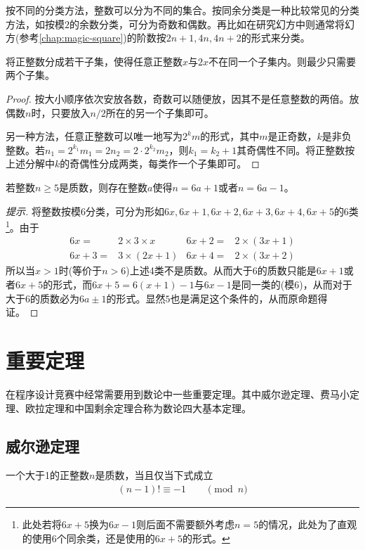 按不同的分类方法，整数可以分为不同的集合。按同余分类是一种比较常见的分类方法，如按模$2$的余数分类，可分为奇数和偶数。再比如在研究幻方中则通常将幻方(参考\ref{chap:magic-square})的阶数按$2n+1, 4n, 4n+2$的形式来分类。

\begin{example}
  将正整数分成若干子集，使得任意正整数$x$与$2x$不在同一个子集内。则最少只需要两个子集。
\end{example}
\begin{proof}
  按大小顺序依次安放各数，奇数可以随便放，因其不是任意整数的两倍。放偶数$n$时，只要放入$n/2$所在的另一个子集即可。

  另一种方法，任意正整数可以唯一地写为$2^km$的形式，其中$m$是正奇数，$k$是非负整数。若$n_1=2^{k_1}m_1 = 2n_2=2\cdot 2^{k_2}m_2$，则$k_1=k_2+1$其奇偶性不同。将正整数按上述分解中$k$的奇偶性分成两类，每类作一个子集即可。
\end{proof}

\begin{example}
  若整数$n\ge5$是质数，则存在整数$a$使得$n=6a+1$或者$n=6a-1$。
\end{example}
\begin{proof}[提示]
  将整数按模6分类，可分为形如$6x, 6x+1, 6x+2, 6x+3, 6x+4, 6x+5$的6类\footnote{此处若将$6x+5$换为$6x-1$则后面不需要额外考虑$n=5$的情况，此处为了直观的使用6个同余类，还是使用的$6x+5$的形式。}。由于
  \begin{align*}
    6x = & 2\times3\times x & 6x+2=&2\times(3x+1)\\
    6x+3=&3\times(2x+1) & 6x+4=&2\times(3x+2)
  \end{align*}
  所以当$x>1$时(等价于$n>6$)上述4类不是质数。从而大于6的质数只能是$6x+1$或者$6x+5$的形式，而$6x+5=6(x+1)-1$与$6x-1$是同一类的(模6)，从而对于大于6的质数必为$6a\pm1$的形式。显然$5$也是满足这个条件的，从而原命题得证。
\end{proof}

\section{重要定理}
\label{sec:important-thorems-of-number-theory}

在程序设计竞赛中经常需要用到数论中一些重要定理。其中威尔逊定理、费马小定理、欧拉定理和中国剩余定理合称为数论四大基本定理。

\subsection{威尔逊定理}
\label{sec:wilson-theorem}
\begin{theorem}
  一个大于1的正整数$n$是质数，当且仅当下式成立
  \begin{align*}
    \left(n-1\right)!\equiv-1 \quad\quad \pmod{n}
  \end{align*}
\end{theorem}

